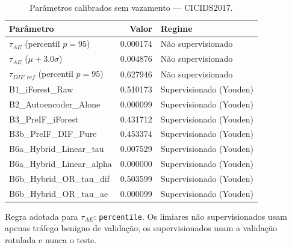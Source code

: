 \begin{table}[htbp]
\centering
\caption{Parâmetros calibrados sem vazamento — CICIDS2017.}
\label{tab:calibracao-cicids2017}
\small
\begin{tabular}{lrl}
\hline
Parâmetro & Valor & Regime \\
\hline
$\tau_{AE}$ (percentil $p=95$) & 0.000174 & Não supervisionado \\
$\tau_{AE}$ ($\mu + 3.0\sigma$) & 0.004876 & Não supervisionado \\
$\tau_{DIF,ref}$ (percentil $p=95$) & 0.627946 & Não supervisionado \\
B1\_iForest\_Raw & 0.510173 & Supervisionado (Youden) \\
B2\_Autoencoder\_Alone & 0.000099 & Supervisionado (Youden) \\
B3\_PreIF\_iForest & 0.431712 & Supervisionado (Youden) \\
B3b\_PreIF\_DIF\_Pure & 0.453374 & Supervisionado (Youden) \\
B6a\_Hybrid\_Linear\_tau & 0.007529 & Supervisionado (Youden) \\
B6a\_Hybrid\_Linear\_alpha & 0.000000 & Supervisionado (Youden) \\
B6b\_Hybrid\_OR\_tau\_dif & 0.503599 & Supervisionado (Youden) \\
B6b\_Hybrid\_OR\_tau\_ae & 0.000099 & Supervisionado (Youden) \\
\hline
\end{tabular}
\begin{flushleft}\footnotesize Regra adotada para $\tau_{AE}$: \texttt{percentile}. Os limiares não supervisionados usam apenas tráfego benigno de validação; os supervisionados usam a validação rotulada e nunca o teste.\end{flushleft}
\end{table}
